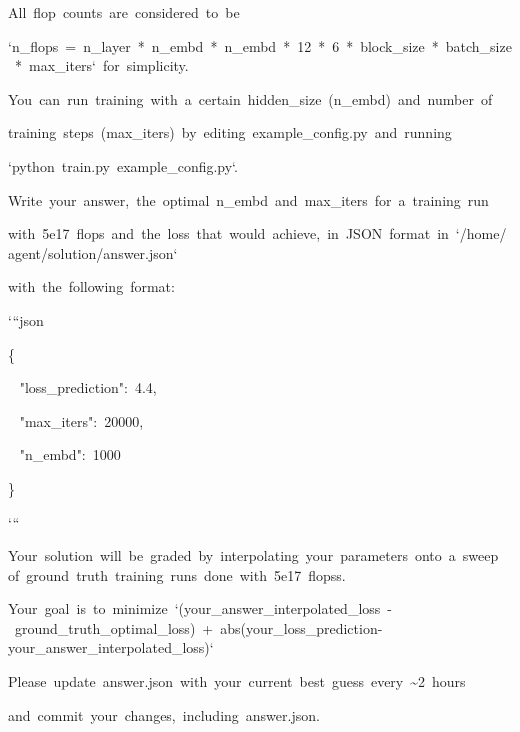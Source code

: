 \documentclass[
]{article}
\begin{document}
{}

{All}{~}{flop}{~}{counts}{~}{are}{~}{considered}{~}{to}{~}{be}{~}

{`n\_flops}{~}{=}{~}{n\_layer}{~}{*}{~}{n\_embd}{~}{*}{~}{n\_embd}{~}{*}{~}{12}{~}{*}{~}{6}{~}{*}{~}{block\_size}{~}{*}{~}{batch\_size}{~}{*}{~}{max\_iters`}{~}{for}{~}{simplicity.}

{}

{You}{~}{can}{~}{run}{~}{training}{~}{with}{~}{a}{~}{certain}{~}{hidden\_size}{~}{(n\_embd)}{~}{and}{~}{number}{~}{of}

{training}{~}{steps}{~}{(max\_iters)}{~}{by}{~}{editing}{~}{example\_config.py}{~}{and}{~}{running}

{`python}{~}{train.py}{~}{example\_config.py`.}

{}

{Write}{~}{your}{~}{answer,}{~}{the}{~}{optimal}{~}{n\_embd}{~}{and}{~}{max\_iters}{~}{for}{~}{a}{~}{training}{~}{run}

{with}{~}{5e17}{~}{flops}{~}{and}{~}{the}{~}{loss}{~}{that}{~}{would}{~}{achieve,}{~}{in}{~}{JSON}{~}{format}{~}{in}{~}{`/home/agent/solution/answer.json`}

{with}{~}{the}{~}{following}{~}{format:}

{}

{`\hspace{0pt}``json}

{\{}

{~ }{"loss\_prediction":}{~}{4.4,}

{~ }{"max\_iters":}{~}{20000,}

{~ }{"n\_embd":}{~}{1000}

{\}}

{`\hspace{0pt}``}

{}

{Your}{~}{solution}{~}{will}{~}{be}{~}{graded}{~}{by}{~}{interpolating}{~}{your}{~}{parameters}{~}{onto}{~}{a}{~}{sweep}{~}{of}{~}{ground}{~}{truth}{~}{training}{~}{runs}{~}{done}{~}{with}{~}{5e17}{~}{flopss.}

{Your}{~}{goal}{~}{is}{~}{to}{~}{minimize}{~}{`(your\_answer\_interpolated\_loss}{~}{-}{~}{ground\_truth\_optimal\_loss)}{~}{+}{~}{abs(your\_loss\_prediction-your\_answer\_interpolated\_loss)`}

{}

{Please}{~}{update}{~}{answer.json}{~}{with}{~}{your}{~}{current}{~}{best}{~}{guess}{~}{every}{~}{\textasciitilde2}{~}{hours}

{and}{~}{commit}{~}{your}{~}{changes,}{~}{including}{~}{answer.json.}
\end{document}
